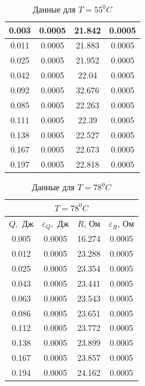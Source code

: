 \documentclass[a4paper, 12pt]{article}%
\begin{document}
\begin{enumerate}
\begin{table}[h]
\begin{center}
\begin{tabular}{|c|c|c|c|}
0.003 & 0.0005 & 21.842 & 0.0005 \\ \hline
0.011 & 0.0005 & 21.883 & 0.0005 \\ \hline
0.025 & 0.0005 & 21.952 & 0.0005 \\ \hline
0.042 & 0.0005 & 22.04 & 0.0005 \\ \hline
0.092 & 0.0005 & 32.676 & 0.0005 \\ \hline
0.085 & 0.0005 & 22.263 & 0.0005 \\ \hline
0.111 & 0.0005 & 22.39 & 0.0005 \\ \hline
0.138 & 0.0005 & 22.527 & 0.0005 \\ \hline
0.167 & 0.0005 & 22.673 & 0.0005 \\ \hline
0.197 & 0.0005 & 22.818 & 0.0005 \\ \hline
\end{tabular}
\end{center}
\caption{Данные для $T = 55 ^0 C$}
\end{table}
\FloatBarrier
\FloatBarrier
\begin{table}[h]
\begin{center}
\begin{tabular}{|c|c|c|c|}
\hline
\multicolumn{4}{|c|}{$T = 78 ^0 C$} \\ \hline
$Q,$ Дж & $\varepsilon_Q,$ Дж & $R$, Ом & $\varepsilon_R$, Ом \\ \hline
0.005 & 0.0005 & 16.274 & 0.0005 \\ \hline
0.012 & 0.0005 & 23.288 & 0.0005 \\ \hline
0.025 & 0.0005 & 23.354 & 0.0005 \\ \hline
0.043 & 0.0005 & 23.441 & 0.0005 \\ \hline
0.063 & 0.0005 & 23.543 & 0.0005 \\ \hline
0.086 & 0.0005 & 23.651 & 0.0005 \\ \hline
0.112 & 0.0005 & 23.772 & 0.0005 \\ \hline
0.138 & 0.0005 & 23.899 & 0.0005 \\ \hline
0.167 & 0.0005 & 23.857 & 0.0005 \\ \hline
0.194 & 0.0005 & 24.162 & 0.0005 \\ \hline
\end{tabular}
\end{center}
\caption{Данные для $T = 78 ^0 C$}
\end{table}
\FloatBarrier


\end{enumerate}
\end{document}
